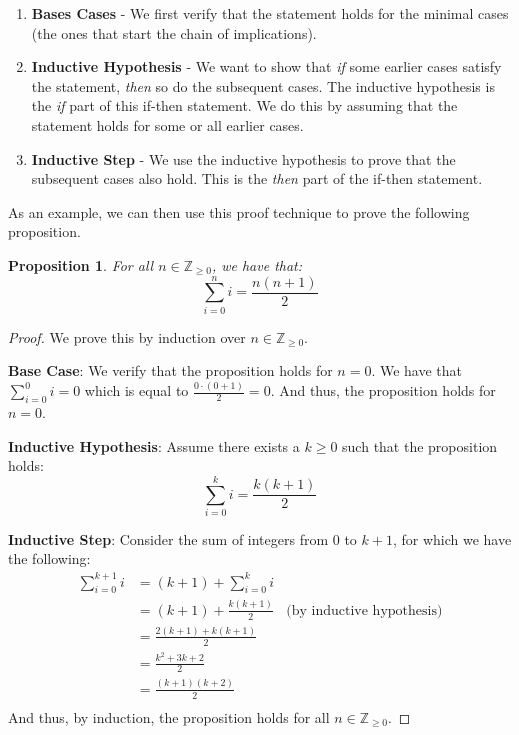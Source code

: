 \documentclass{article}
\newcommand{\ZZ}{\mathbb{Z}_{\geq 0}}
\theoremstyle{plain}
\newtheorem{proposition}{Proposition}
\theoremstyle{definition}
\begin{document}
\begin{enumerate}
    \item \textbf{Bases Cases} - We first verify that the statement holds for the minimal cases (the ones that start the chain of implications).
    \item \textbf{Inductive Hypothesis} - We want to show that \emph{if} some earlier cases satisfy the statement, \emph{then} so do the subsequent cases. The inductive hypothesis is the \emph{if} part of this if-then statement. We do this by assuming that the statement holds for some or all earlier cases.
    \item \textbf{Inductive Step} - We use the inductive hypothesis to prove that the subsequent cases also hold. This is the \emph{then} part of the if-then statement.
\end{enumerate}

As an example, we can then use this proof technique to prove the following proposition.

\begin{proposition}
    For all \(n \in \ZZ\), we have that:
    \[\sum_{i=0}^n i = \frac{n(n+1)}{2}\]
\end{proposition}
\begin{proof}
    We prove this by induction over \(n \in \ZZ\).
    
    \textbf{Base Case}: We verify that the proposition holds for \(n=0\). We have that \(\sum_{i=0}^0 i = 0\) which is equal to \(\frac{0 \cdot (0 + 1)}{2} = 0\). And thus, the proposition holds for \(n=0\).

    \textbf{Inductive Hypothesis}: Assume there exists a \(k \geq 0\) such that the proposition holds:
    \[\sum_{i=0}^k i = \frac{k(k+1)}{2}\]

    \textbf{Inductive Step}: Consider the sum of integers from \(0\) to \(k+1\), for which we have the following:
    \begin{align*}
        \sum_{i=0}^{k+1} i &= (k+1) + \sum_{i = 0}^{k} i \\
        &= (k+1) + \frac{k(k+1)}{2}\ \ \ \ \text{(by inductive hypothesis)} \\
        &= \frac{2(k+1) + k(k+1)}{2} \\
        &= \frac{k^2 + 3k + 2}{2} \\ 
        &= \frac{(k+1)(k+2)}{2} \\ 
    \end{align*}
    And thus, by induction, the proposition holds for all \(n \in \ZZ\).
\end{proof}
\end{document}
